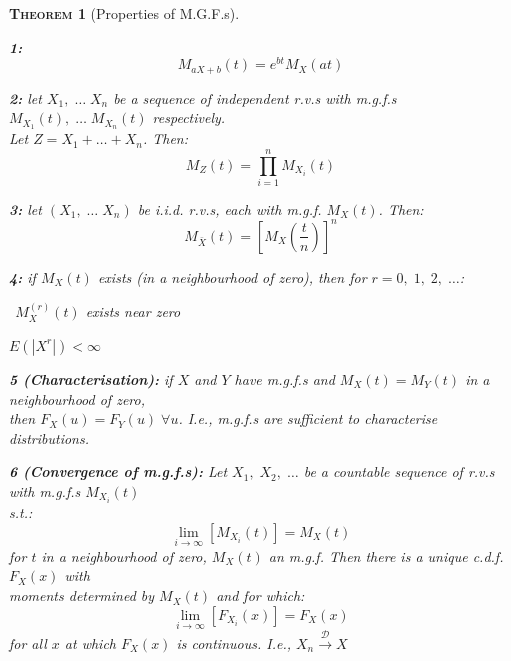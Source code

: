 \documentclass[12pt,a4paper]{article}
\newtheorem{theorem}{\textsc{Theorem}}[section]
\begin{document}
\begin{theorem}[Properties of M.G.F.s]\label{mgf properties}$\;$\par\vspace{1cm}

{\bf 1: }
$$M_{aX+b}(t) = e^{bt}M_X(at)$$\par\vspace{1cm}

{\bf 2: } let $X_1,\;\hdots\;X_n$ be a sequence of independent r.v.s with m.g.f.s $M_{X_1}(t),\;\hdots\;M_{X_n}(t)$ respectively.\\ \indent\indent Let $Z= X_1 + \hdots + X_n$. Then:
$$M_Z(t) = \prod_{i=1}^n M_{X_i}(t)$$\par\vspace{1cm}

{\bf 3: } let $(X_1,\;\hdots\;X_n)$ be i.i.d. r.v.s, each with m.g.f. $M_X(t)$. Then:
$$M_{\bar{X}}(t) = \left[M_X\left(\frac{t}{n}\right)\right]^n$$\par\vspace{1cm}

{\bf 4: } if $M_X(t)$ exists (in a neighbourhood of zero), then for $r=0,\;1,\;2,\;\hdots$:\par
\indent{}  $\;\,M_X^{(r)}(t)$ exists near zero\par
\indent{}  $E\left(\left|X^r\right|\right) < \infty$\par

{\bf 5 (Characterisation): } if $X$ and $Y$ have m.g.f.s and $M_X(t) = M_Y(t)$ in a neighbourhood of zero,\\ \indent\indent then $F_X(u) = F_Y(u)\;\forall u$. I.e., m.g.f.s are sufficient to characterise distributions.\par\vspace{1cm}

{\bf 6 (Convergence of m.g.f.s): } Let $X_1,\;X_2,\;\hdots$ be a countable sequence of r.v.s with m.g.f.s $M_{X_i}(t)$\\ \indent\indent s.t.:
$$\lim_{i\to\infty}\left[M_{X_i}(t)\right] = M_X(t)$$
\indent\indent for $t$ in a neighbourhood of zero, $M_X(t)$ an m.g.f. Then there is a unique c.d.f. $F_X(x)$ with\\ \indent\indent moments determined by $M_X(t)$ and for which:
$$\lim_{i\to\infty}\left[F_{X_i}(x)\right] = F_X(x)$$
\indent\indent for all $x$ at which $F_X(x)$ is continuous. I.e., $X_n\xrightarrow{\mathscr{D}}X$

\end{theorem}
\end{document}
